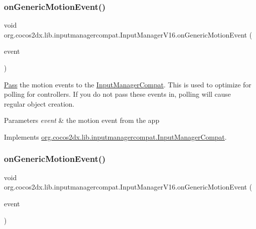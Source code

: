 \subsubsection{\texorpdfstring{on\+Generic\+Motion\+Event()}{onGenericMotionEvent()}\hspace{0.1cm}{\footnotesize\ttfamily [1/2]}}
{\footnotesize\ttfamily void org.\+cocos2dx.\+lib.\+inputmanagercompat.\+Input\+Manager\+V16.\+on\+Generic\+Motion\+Event (\begin{DoxyParamCaption}\item[{Motion\+Event}]{event }\end{DoxyParamCaption})\hspace{0.3cm}{\ttfamily [inline]}}

\hyperlink{classPass}{Pass} the motion events to the \hyperlink{interfaceorg_1_1cocos2dx_1_1lib_1_1inputmanagercompat_1_1InputManagerCompat}{Input\+Manager\+Compat}. This is used to optimize for polling for controllers. If you do not pass these events in, polling will cause regular object creation.


\begin{DoxyParams}{Parameters}
{\em event} & the motion event from the app \\
\hline
\end{DoxyParams}


Implements \hyperlink{interfaceorg_1_1cocos2dx_1_1lib_1_1inputmanagercompat_1_1InputManagerCompat_a813a0308659d716c9503d44ccb48ebb1}{org.\+cocos2dx.\+lib.\+inputmanagercompat.\+Input\+Manager\+Compat}.

\mbox{\label{classorg_1_1cocos2dx_1_1lib_1_1inputmanagercompat_1_1InputManagerV16_ab72ef0c7bf1fcc4cbd2f609d2e47f745}} 
\subsubsection{\texorpdfstring{on\+Generic\+Motion\+Event()}{onGenericMotionEvent()}\hspace{0.1cm}{\footnotesize\ttfamily [2/2]}}
{\footnotesize\ttfamily void org.\+cocos2dx.\+lib.\+inputmanagercompat.\+Input\+Manager\+V16.\+on\+Generic\+Motion\+Event (\begin{DoxyParamCaption}\item[{Motion\+Event}]{event }\end{DoxyParamCaption})\hspace{0.3cm}{\ttfamily [inline]}}

